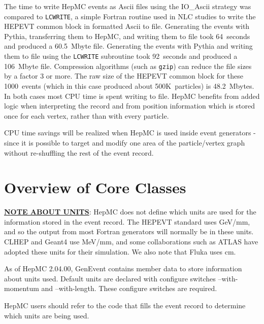 \documentclass[11pt,letterpaper]{article}
\begin{document}
The time to write HepMC events as Ascii files using the IO\_Ascii
strategy was compared to \verb!LCWRITE!, a simple Fortran routine used
in NLC studies to write the HEPEVT common block in formatted Ascii to file.
Generating the events with Pythia, transferring them to HepMC, and
writing them to file took 64~seconds and produced a 60.5~Mbyte file.
Generating the events with Pythia and writing them to file using the
\verb!LCWRITE! subroutine took 92~seconds and produced a 106~Mbyte
file. Compression algorithms (such as \verb!gzip!) can reduce the file
sizes by a factor 3 or more.  The raw size of the HEPEVT common block
for these 1000~events (which in this case produced about 500K~particles) is
48.2~Mbytes.  In both cases most CPU time is spent writing to file.
HepMC benefits from added logic when interpreting the record and from 
position information which is stored once for each vertex, rather than
with every particle.  

CPU time savings will be realized when HepMC is
used inside event generators - since it is possible to target and
modify one area of the particle/vertex graph without re-shuffling the
rest of the event record.

%
%
\section{Overview of Core Classes}

\underline{\bf NOTE ABOUT UNITS}:
HepMC does not define which units are used for the information stored
in the event record.
The HEPEVT standard uses GeV/mm, and so the output from most Fortran
generators will normally be in these units.
CLHEP and Geant4 use MeV/mm, and some collaborations such as ATLAS
have adopted these units for their simulation.
We also note that Fluka uses cm.

As of HepMC 2.04.00, GenEvent contains member data to store information
about units used.  Default units are declared with configure switches 
--with-momentum and --with-length.  
These configure switches are required.

HepMC users should refer to the code that fills the event record 
to determine which units are being used.

%
%
\end{document}
